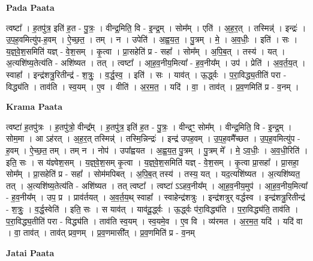 \documentclass[17pt]{extarticle}
\begin{document}
\textbf{Pada Paata} \newline

त्वष्टा᳚ । ह॒तपु॑त्र॒ इति॑ ह॒त - पु॒त्रः॒ । वीन्द्र॒मिति॒ वि - इ॒न्द्र॒म् । सोम᳚म् । एति॑ । अ॒ह॒र॒त् । तस्मिन्न्॑ । इन्द्रः॑ । उ॒प॒ह॒वमित्यु॑प-ह॒वम् । ऐ॒च्छ॒त॒ । तम् । न । उपेति॑ । अ॒ह्व॒य॒त॒ । पु॒त्रम् । मे॒ । अ॒व॒धीः॒ । इति॑ । सः । य॒ज्ञ्॒वे॒श॒समिति॑ यज्ञ् - वे॒श॒सम् । कृ॒त्वा । प्रा॒सहेति॑ प्र - सहा᳚ । सोम᳚म् । अ॒पि॒ब॒त् । तस्य॑ । यत् । अ॒त्यशि॑ष्य॒तेत्य॑ति - अशि॑ष्यत । तत् । त्वष्टा᳚ । आ॒ह॒व॒नीय॒मित्या᳚ - ह॒व॒नीय᳚म् । उप॑ । प्रेति॑ । अ॒व॒र्त॒य॒त् । स्वाहा᳚ । इन्द्र॑शत्रु॒रितीन्द्र॑ -  श॒त्रुः॒ । व॒र्द्ध॒स्व॒ । इति॑ । सः । याव॑त् । ऊ॒र्द्ध्वः । प॒रा॒विद्ध्य॒तीति॑ परा - विद्ध्य॑ति । ताव॑ति । स्व॒यम् । ए॒व । वीति॑ । अ॒र॒म॒त॒ । यदि॑ । वा॒ । ताव॑त् । प्र॒व॒णमिति॑ प्र - व॒नम् ।  \newline


\textbf{Krama Paata} \newline

त्वष्टा॑ ह॒तपु॑त्रः । ह॒तपु॑त्रो॒ वीन्द्र᳚म् । ह॒तपु॑त्र॒ इति॑ ह॒त - पु॒त्रः॒ । वीन्द्रꣳ॒॒ सोम᳚म् । वीन्द्र॒मिति॒ वि - इ॒न्द्र॒म् । सोम॒मा । आ ऽह॑रत् । अ॒ह॒र॒त् तस्मिन्न्॑ । तस्मि॒न्निन्द्रः॑ । इन्द्र॑ उपह॒वम् । उ॒प॒ह॒वमै᳚च्छत । उ॒प॒ह॒वमित्यु॑प - ह॒वम् । ऐ॒च्छ॒त॒ तम् । तम् न । नोप॑ । उपा᳚ह्वयत । अ॒ह्व॒य॒त॒ पु॒त्रम् । पु॒त्रम् मे᳚ । मे॒ ऽव॒धीः॒ । अ॒व॒धी॒रिति॑ । इति॒ सः । स य॑ज्ञ्वेश॒सम् । य॒ज्ञ्॒वे॒श॒सम् कृ॒त्वा । य॒ज्ञ्॒वे॒श॒समिति॑ यज्ञ् - वे॒श॒सम् । कृ॒त्वा प्रा॒सहा᳚ । प्रा॒सहा॒ सोम᳚म् । प्रा॒सहेति॑ प्र - सहा᳚ । सोम॑मपिबत् । अ॒पि॒ब॒त् तस्य॑ । तस्य॒ यत् । यद॒त्यशि॑ष्यत । अ॒त्यशि॑ष्यत॒ तत् । अ॒त्यशि॑ष्य॒तेत्य॑ति - अशि॑ष्यत । तत् त्वष्टा᳚ । त्वष्टा॑ ऽऽहव॒नीय᳚म् । आ॒ह॒व॒नीय॒मुप॑ । आ॒ह॒व॒नीय॒मित्या᳚ - ह॒व॒नीय᳚म् । उप॒ प्र । प्राव॑र्तयत् । अ॒व॒र्त॒य॒थ् स्वाहा᳚ । स्वाहेन्द्र॑शत्रुः । इन्द्र॑शत्रुर् वर्द्धस्व । इन्द्र॑शत्रु॒रितीन्द्र॑ - श॒त्रुः॒ । व॒र्द्ध॒स्वेति॑ । इति॒ सः । स याव॑त् । याव॑दू॒र्द्ध्वः । ऊ॒र्द्ध्वः प॑रा॒विद्ध्य॑ति । प॒रा॒विद्ध्य॑ति॒ ताव॑ति । प॒रा॒विद्ध्य॒तीति॑ परा - विद्ध्य॑ति । ताव॑ति स्व॒यम् । स्व॒यमे॒व । ए॒व वि । व्य॑रमत । अ॒र॒म॒त॒ यदि॑ । यदि॑ वा । वा॒ ताव॑त् । ताव॑त् प्रव॒णम् । प्र॒व॒णमासी᳚त् । प्र॒व॒णमिति॑ प्र - व॒नम् \newline

\textbf{Jatai Paata} \newline
\end{document}

